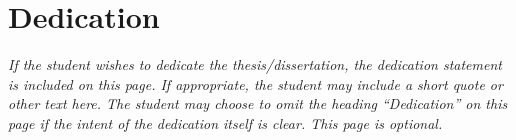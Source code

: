 \chapter*{Dedication} \label{dedication}

{\itshape If the student wishes to dedicate the thesis/dissertation, the dedication
statement is included on this page. If appropriate, the student may include
a short quote or other text here. The student may choose to omit the heading
``Dedication'' on this page if the intent of the dedication itself is clear.
This page is optional.}

